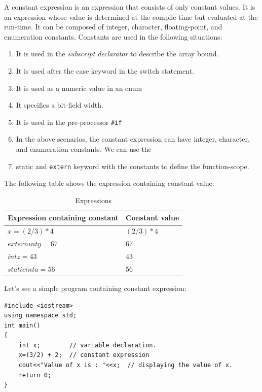 \documentclass{book}
\begin{document}
A constant expression is an expression that consists of only constant values. It is an expression whose value is determined at the compile-time but evaluated at the run-time. It can be composed of integer, character, floating-point, and enumeration constants. Constants are used in the following situations:

\begin{enumerate}
	\item It is used in the \textit{subscript declarator} to describe the array bound.
\item It is used after the case keyword in the switch statement.
\item It is used as a numeric value in an enum
\item It specifies a bit-field width.
\item It is used in the pre-processor \texttt{#if}
\item In the above scenarios, the constant expression can have integer, character, and enumeration constants. We can use the \item static and \texttt{extern} keyword with the constants to define the function-scope.

\end{enumerate}

The following table shows the expression containing constant value:

\begin{table}[h]
\centering 
\begin{tabular}{ll} \hline 
Expression containing constant	& Constant value \\ \hline 
$x = (2/3) * 4$	& $(2/3) * 4$ \\
$extern int y = 67$	& 67 \\
$int z = 43$	& 43 \\
$static int a = 56$	& 56 \\ \hline 

\end{tabular}
\caption{Expressions }
\label{}
\end{table}

Let's see a simple program containing constant expression:

\begin{lstlisting}
#include <iostream>  
using namespace std;  
int main()  
{  
	int x;        // variable declaration.  
	x=(3/2) + 2;  // constant expression  
	cout<<"Value of x is : "<<x;  // displaying the value of x.  
	return 0;  
}  
\end{lstlisting}
\end{document}
